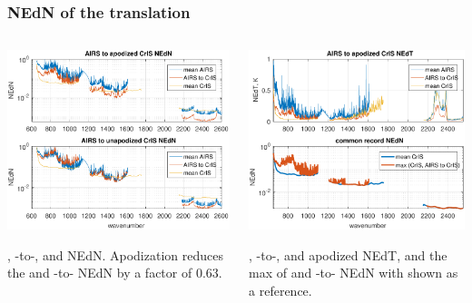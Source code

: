 \documentclass[10pt]{beamer}
\begin{document}
\begin{frame}
\frametitle{NEdN of the translation}
\begin{columns}[t]
\begin{column}{0.5\textwidth}  
  \begin{centering}
  \includegraphics[width=\textwidth]{figures/a2cris_nedn.pdf}
  \end{centering}\vspace{4mm}
  {\airs}, {\airs}-to-{\cris}, and {\cris} NEdN.  Apodization
  reduces the {\cris} and {\airs}-to-{\cris} NEdN by a factor of
  $0.63$.

\end{column}
\begin{column}{0.5\textwidth}
  \begin{centering}
  \includegraphics[width=\textwidth]{figures/a2cris_nedt.pdf}
  \end{centering}\vspace{3mm}
  {\airs}, {\airs}-to-{\cris}, and {\cris} apodized NEdT, and the
  max of {\cris} and {\airs}-to-{\cris} NEdN with {\cris} shown as
  a reference.
 

\end{column}
\end{columns}
\end{frame}
\end{document}
